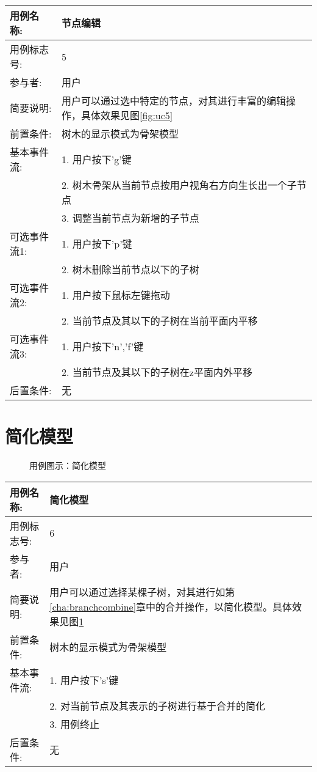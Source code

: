 \begin{table}[H]
	\centering
\begin{tabular}{|l|p{8cm}|}
	\hline
	用例名称: & 节点编辑\\
	\hline
	用例标志号: & 5\\
	\hline
	参与者: & 用户\\
	\hline
	简要说明: & 用户可以通过选中特定的节点，对其进行丰富的编辑操作，具体效果见图\ref{fig:uc5}\\
	\hline
	前置条件: & 树木的显示模式为骨架模型\\
	\hline
	基本事件流: & 1. 用户按下'g'键\\
	 & 2. 树木骨架从当前节点按用户视角右方向生长出一个子节点\\
	 & 3. 调整当前节点为新增的子节点\\
	\hline
	可选事件流1: & 1. 用户按下'p'键\\
	 & 2. 树木删除当前节点以下的子树\\
	\hline
	可选事件流2: & 1. 用户按下鼠标左键拖动\\
	 & 2. 当前节点及其以下的子树在当前平面内平移\\
	\hline
	可选事件流3: & 1. 用户按下'n','f'键\\
	 & 2. 当前节点及其以下的子树在z平面内外平移\\
	\hline
	后置条件: & 无\\
	\hline
\end{tabular}
\end{table}

\clearpage
\section{简化模型}
\begin{figure}[H]
	\centering
	\hspace{5em}
	\hspace{5em}
	\caption{用例图示：简化模型}
	\label{fig:uc6}
\end{figure}

\begin{table}[H]
	\centering
\begin{tabular}{|l|p{8cm}|}
	\hline
	用例名称: & 简化模型\\
	\hline
	用例标志号: & 6\\
	\hline
	参与者: & 用户\\
	\hline
	简要说明: & 用户可以通过选择某棵子树，对其进行如第\ref{cha:branchcombine}章中的合并操作，以简化模型。具体效果见图\ref{fig:uc6}\\
	\hline
	前置条件: & 树木的显示模式为骨架模型\\
	\hline
	基本事件流: & 1. 用户按下's'键\\
	 & 2. 对当前节点及其表示的子树进行基于合并的简化\\
	 & 3. 用例终止\\
	\hline
	后置条件: & 无\\
	\hline
\end{tabular}
\end{table}

